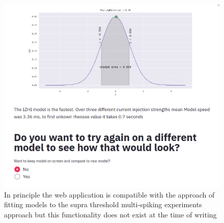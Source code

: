 \begin{figure}
\begin{center}
\includegraphics[scale=1]{figures/fixed_white_space.png}
\caption[Web application Z-score view]{In principle the web application is compatible with the approach of fitting models to the supra threshold multi-spiking experiments approach but this functionality does not exist at the time of writing}
\end{center}
\end{figure}
